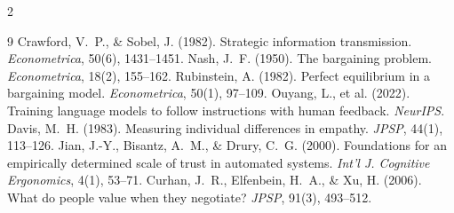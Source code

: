 \documentclass[10pt,a4paper]{article}
\begin{document}
\begin{multicols}{2}
\begin{thebibliography}{9}
 Crawford, V.~P., \& Sobel, J. (1982). Strategic information transmission. \textit{Econometrica}, 50(6), 1431--1451.
 Nash, J.~F. (1950). The bargaining problem. \textit{Econometrica}, 18(2), 155--162.
 Rubinstein, A. (1982). Perfect equilibrium in a bargaining model. \textit{Econometrica}, 50(1), 97--109.
 Ouyang, L., et al. (2022). Training language models to follow instructions with human feedback. \textit{NeurIPS}.
 Davis, M.~H. (1983). Measuring individual differences in empathy. \textit{JPSP}, 44(1), 113--126.
 Jian, J.-Y., Bisantz, A.~M., \& Drury, C.~G. (2000). Foundations for an empirically determined scale of trust in automated systems. \textit{Int'l J. Cognitive Ergonomics}, 4(1), 53--71.
 Curhan, J.~R., Elfenbein, H.~A., \& Xu, H. (2006). What do people value when they negotiate? \textit{JPSP}, 91(3), 493--512.
\end{thebibliography}

\end{multicols}


\appendix
\end{document}
